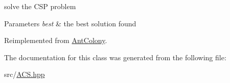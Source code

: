 solve the C\+SP problem 


\begin{DoxyParams}{Parameters}
{\em best} & the best solution found \\
\hline
\end{DoxyParams}


Reimplemented from \hyperlink{classAntColony_a2928867b4646afc1c3d553848ed093aa}{Ant\+Colony}.



The documentation for this class was generated from the following file\+:\begin{DoxyCompactItemize}
\item 
src/\hyperlink{ACS_8hpp}{A\+C\+S.\+hpp}\end{DoxyCompactItemize}
